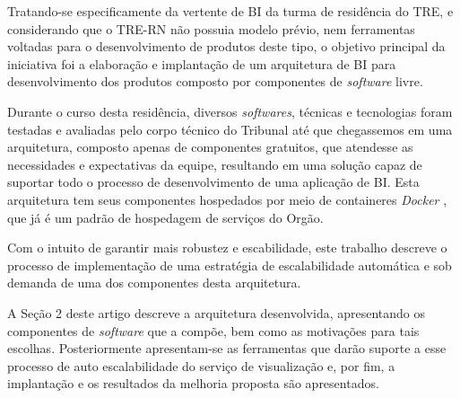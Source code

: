 Tratando-se especificamente da vertente de BI da turma de residência do TRE, e considerando que o TRE-RN não possuia modelo prévio, nem ferramentas voltadas para o desenvolvimento de produtos deste tipo, o objetivo principal da iniciativa foi a elaboração e implantação de um arquitetura de BI para desenvolvimento dos produtos composto por componentes de \textit{software} livre. 

Durante o curso desta residência, diversos \textit{softwares}, técnicas e tecnologias foram testadas e avaliadas pelo corpo técnico do Tribunal até que chegassemos em uma arquitetura, composto apenas de componentes gratuitos, que atendesse as necessidades e expectativas da equipe, resultando em uma solução capaz de suportar todo o processo de desenvolvimento de uma aplicação de BI. Esta arquitetura tem seus componentes hospedados por meio de containeres \textit{Docker} \cite{dockerDoc}, que já é um padrão de hospedagem de serviços do Orgão.

Com o intuito de garantir mais robustez e escabilidade, este trabalho descreve o processo de implementação de uma estratégia de escalabilidade automática e sob demanda de uma dos componentes desta arquitetura.  

A Seção 2 deste artigo descreve a arquitetura desenvolvida, apresentando os componentes de \textit{software} que a compõe, bem como as motivações para tais escolhas. Posteriormente apresentam-se as ferramentas que darão suporte a esse processo de auto escalabilidade do serviço de visualização e, por fim, a implantação e os resultados da melhoria proposta são apresentados.